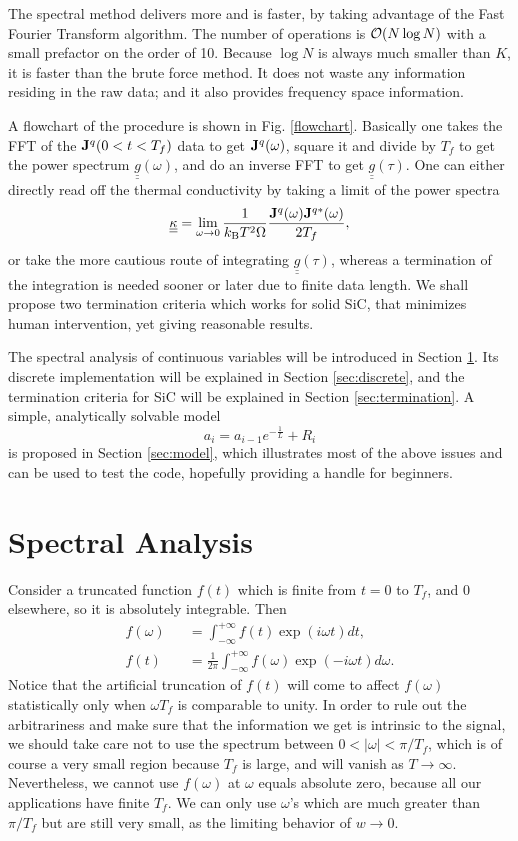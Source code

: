 The spectral method delivers more and is faster, by taking advantage
of the Fast Fourier Transform algorithm\cite{Press}.  The number of
operations is ${\cal O}(N\log N)$ with a small prefactor on the order
of 10. Because $\log N$ is always much smaller than $K$, it is faster
than the brute force method. It does not waste any information
residing in the raw data; and it also provides frequency space
information.

A flowchart of the procedure is shown in Fig. \ref{flowchart}.
Basically one takes the FFT of the ${\bf J}^q(0<t<T_{f})$ data to get
${\bf J}^q(\omega)$, square it and divide by $T_{f}$ to get the power
spectrum $\underline{\underline{g}}(\omega)$, and do an inverse FFT to
get $\underline{\underline{g}}(\tau)$. One can either directly read
off the thermal conductivity by taking a limit of the power spectra
$$
\underline{\underline{\kappa}} = \lim_{\omega \rightarrow 0} 
\frac{1}{k_{\rm B}T^2\Omega} 
\frac{{\bf J}^q(\omega){\bf J}^{q*}(\omega)}{2T_{f}},
$$
or take the more cautious route of integrating
$\underline{\underline{g}}(\tau)$, whereas a termination of the
integration is needed sooner or later due to finite data length.  We
shall propose two termination criteria which works for solid SiC, that
minimizes human intervention, yet giving reasonable results.

The spectral analysis of continuous variables will be introduced in
Section \ref{sec:spectral}. Its discrete implementation will be
explained in Section \ref{sec:discrete}, and the termination criteria
for SiC will be explained in Section \ref{sec:termination}.  A simple,
analytically solvable model
$$a_i = a_{i-1}e^{-\frac{1}{L}}+ R_{i}$$
is proposed in Section
\ref{sec:model}, which illustrates most of the above issues and can be
used to test the code, hopefully providing a handle for beginners.

\section{Spectral Analysis}
\label{sec:spectral}

Consider a truncated function $f(t)$ which is finite from $t=0$ to
$T_{f}$, and $0$ elsewhere, so it is absolutely integrable. Then
\begin{eqnarray}
f(\omega) &&= \int^{+\infty}_{-\infty} f(t) \exp(i\omega t) dt,
\label{first:1} \\
f(t) && = \frac{1}{2\pi} \int^{+\infty}_{-\infty} f(\omega)
\exp(-i\omega t) d\omega.
\label{first:2} 
\end{eqnarray}
Notice that the artificial truncation of $f(t)$ will come to affect
$f(\omega)$ statistically only when $\omega T_{f}$ is comparable to
unity. In order to rule out the arbitrariness and make sure that the
information we get is intrinsic to the signal, we should take care not
to use the spectrum between $0<|\omega|<\pi /T_{f}$, which is of
course a very small region because $T_{f}$ is large, and will vanish
as $T\rightarrow \infty$. Nevertheless, we cannot use $f(\omega)$ at
$\omega$ equals absolute zero, because all our applications have
finite $T_{f}$. We can only use $\omega$'s which are much greater than
$\pi /T_{f}$ but are still very small, as the limiting behavior of
$w\rightarrow 0$.


